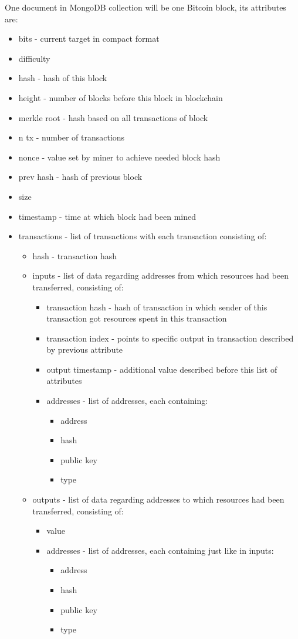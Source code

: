 \documentclass[12pt, en, eng, twoside, final]{mgr}
\begin{document}
One document in MongoDB collection will be one Bitcoin block, its attributes are:
\begin{itemize}
\item
bits - current target in compact format \cite{bitcoin-wiki-bha}
\item
difficulty
\item
hash - hash of this block
\item
height - number of blocks before this block in blockchain
\item
merkle root - hash based on all transactions of block
\item
n tx - number of transactions
\item
nonce - value set by miner to achieve needed block hash
\item
prev hash - hash of previous block
\item
size
\item
timestamp - time at which block had been mined
\item
transactions - list of transactions with each transaction consisting of:
\begin{itemize}
\item
hash - transaction hash
\item
inputs - list of data regarding addresses from which resources had been transferred, consisting of:
\begin{itemize}
\item
transaction hash - hash of transaction in which sender of this transaction got resources spent in this transaction
\item
transaction index - points to specific output in transaction described by previous attribute
\item
output timestamp - additional value described before this list of attributes
\item addresses - list of addresses, each containing:
\begin{itemize}
\item
address
\item
hash
\item
public key
\item
type
\end{itemize}
\end{itemize}	
\item
outputs - list of data regarding addresses to which resources had been transferred, consisting of:	
\begin{itemize}
\item
value
\item addresses - list of addresses, each containing just like in inputs:
\begin{itemize}
\item
address
\item
hash
\item
public key
\item
type
\end{itemize}
\end{itemize} 	
\end{itemize}
\end{itemize}
\end{document}
